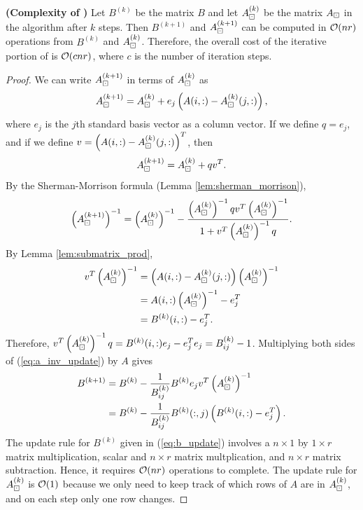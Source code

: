 \documentclass{article}
\begin{document}
	\begin{thm} \textnormal{\bf(Complexity of \maxvol{} \cite{goreinov_2010})}
		Let $B^{(k)}$ be the matrix $B$ and let $A_\boxdot^{(k)}$ be the matrix $A_\boxdot$ in the \maxvol{} algorithm after $k$ steps. Then $B^{(k+1)}$ and $A_\boxdot^{(k+1)}$ can be computed in $\mathcal{O}(nr)$ operations from $B^{(k)}$ and $A_\boxdot^{(k)}$. Therefore, the overall cost of the iterative portion of \maxvol{} is $\mathcal{O}(cnr)$, where $c$ is the number of iteration steps.
	\end{thm}
	
	\begin{proof}
		We can write $A_\boxdot^{(k+1)}$ in terms of $A_\boxdot^{(k)}$ as
		\begin{equation}
			A_\boxdot^{(k+1)} = A_\boxdot^{(k)} + e_j\left(A(i,:) - A_\boxdot^{(k)}(j,:)\right),
		\end{equation}
		where $e_j$ is the $j$th standard basis vector as a column vector. If we define $q = e_j$, and if we define $v = \left(A(i,:) - A_\boxdot^{(k)}(j,:)\right)^T$, then
		\begin{equation}
			A_\boxdot^{(k+1)} = A_\boxdot^{(k)} + qv^T.
		\end{equation}
		By the Sherman-Morrison formula (Lemma \ref{lem:sherman_morrison}),
		\begin{equation}
			\label{eq:a_inv_update}
			\left(A_\boxdot^{(k+1)}\right)^{-1} = \left(A_\boxdot^{(k)}\right)^{-1} - \frac{\left(A_\boxdot^{(k)}\right)^{-1}qv^T\left(A_\boxdot^{(k)}\right)^{-1}}{1 +v^T\left(A_\boxdot^{(k)}\right)^{-1}q}.
		\end{equation}
		By Lemma \ref{lem:submatrix_prod},
		\begin{align}
			v^T\left(A_\boxdot^{(k)}\right)^{-1} &= \left(A(i,:) - A_\boxdot^{(k)}(j,:)\right)\left(A_\boxdot^{(k)}\right)^{-1} \\
			&= A(i,:)\left(A_\boxdot^{(k)}\right)^{-1} - e_j^T \\
			&= B^{(k)}(i,:) - e_j^T.
		\end{align}
		Therefore, $v^T\left(A_\boxdot^{(k)}\right)^{-1}q = B^{(k)}(i,:)e_j - e_j^Te_j = B^{(k)}_{ij}-1$.
		Multiplying both sides of (\ref{eq:a_inv_update}) by $A$ gives
		\begin{align}
			B^{(k+1)} &= B^{(k)} - \frac{1}{B^{(k)}_{ij}}B^{(k)}e_jv^T\left(A_\boxdot^{(k)}\right)^{-1} \\
			\label{eq:b_update}
			&=B^{(k)} - \frac{1}{B^{(k)}_{ij}}B^{(k)}(:,j)\left(B^{(k)}(i,:) - e_j^T\right).
		\end{align}
		The update rule for $B^{(k)}$ given in (\ref{eq:b_update}) involves a $n\times 1$ by $1\times r$ matrix multiplication, scalar and $n\times r$ matrix multplication, and $n\times r$ matrix subtraction. Hence, it requires $\mathcal{O}(nr)$ operations to complete. The update rule for $A_\boxdot^{(k)}$ is $\mathcal{O}(1)$ because we only need to keep track of which rows of $A$ are in $A_\boxdot^{(k)}$, and on each step only one row changes. 
		
	\end{proof}
	
\end{document}
